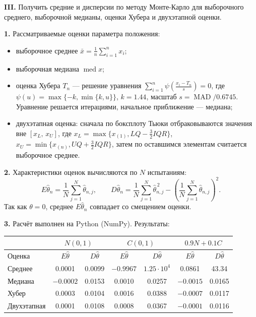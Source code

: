 \documentclass{article}
\begin{document}
\begin{framed}
    \textbf{III.} Получить средние и дисперсии по методу Монте-Карло для выборочного среднего,
    выборочной медианы, оценки Хубера и двухэтапной оценки.
\end{framed}
    \textbf{1.} Рассматриваемые оценки параметра положения:
    \begin{itemize}
        \item выборочное среднее $\bar x=\frac{1}{n}\sum_{i=1}^{n}x_i$;
        \item выборочная медиана $\operatorname{med}x$;
        \item оценка Хубера $T_n$ --- решение уравнения $\sum_{i=1}^{n}\psi\!\left(\frac{x_i-T_n}{s}\right)=0$, где $\psi(u)=\max\{-k,\min\{k,u\}\}$, $k=1.44$, масштаб $s=\operatorname{MAD}/0.6745$. Уравнение решается итерациями, начальное приближение --- медиана;
        \item двухэтапная оценка: сначала по боксплоту Тьюки отбраковываются значения вне $[x_L,\,x_U]$, где $x_L=\max\{x_{(1)},LQ-\frac{3}{2}IQR\}$, $x_U=\min\{x_{(n)},UQ+\frac{3}{2}IQR\}$, затем по оставшимся элементам считается выборочное среднее.
    \end{itemize}

    \textbf{2.} Характеристики оценок вычисляются по $N$ испытаниям:
    \[E\hat\theta_n=\frac{1}{N}\sum_{j=1}^{N}\hat\theta_{n,j},\qquad D\hat\theta_n=\frac{1}{N}\sum_{j=1}^{N}\hat\theta_{n,j}^{\,2}-\left(\frac{1}{N}\sum_{j=1}^{N}\hat\theta_{n,j}\right)^2.\]
    Так как $\theta=0$, среднее $E\hat\theta_n$ совпадает со смещением оценки.

    \textbf{3.} Расчёт выполнен на Python (NumPy). Результаты:
    \begin{center}
    \begin{tabular}{|l|c|c|c|c|c|c|}
        \hline
        & \multicolumn{2}{c|}{$N(0,1)$} & \multicolumn{2}{c|}{$C(0,1)$} & \multicolumn{2}{c|}{$0.9N+0.1C$} \\ \hline
        Оценка & $E\hat\theta$ & $D\hat\theta$ & $E\hat\theta$ & $D\hat\theta$ & $E\hat\theta$ & $D\hat\theta$ \\ \hline
        Среднее & 0.0001 & 0.0099 & $-0.9967$ & $1.25\cdot10^{4}$ & 0.0861 & 43.34 \\
        Медиана & $-0.0002$ & 0.0153 & 0.0010 & 0.0257 & $-0.0015$ & 0.0165 \\
        Хубер & 0.0003 & 0.0104 & 0.0016 & 0.0388 & $-0.0007$ & 0.0117 \\
        Двухэтапная & 0.0001 & 0.0108 & 0.0008 & 0.0367 & $-0.0001$ & 0.0116 \\ \hline
    \end{tabular}
    \end{center}
\end{document}
